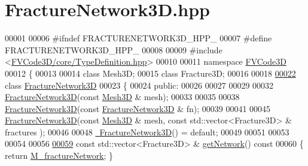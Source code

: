 \hypertarget{FractureNetwork3D_8hpp_source}{}\section{Fracture\+Network3\+D.\+hpp}
\label{FractureNetwork3D_8hpp_source}

\begin{DoxyCode}
00001 
00006 \textcolor{preprocessor}{#ifndef FRACTURENETWORK3D\_HPP\_}
00007 \textcolor{preprocessor}{#define FRACTURENETWORK3D\_HPP\_}
00008 
00009 \textcolor{preprocessor}{#include <\hyperlink{TypeDefinition_8hpp}{FVCode3D/core/TypeDefinition.hpp}>}
00010 
00011 \textcolor{keyword}{namespace }\hyperlink{namespaceFVCode3D}{FVCode3D}
00012 \{
00013 
00014 \textcolor{keyword}{class }Mesh3D;
00015 \textcolor{keyword}{class }Fracture3D;
00016 
00018 
\hypertarget{FractureNetwork3D_8hpp_source.tex_l00022}{}\hyperlink{classFVCode3D_1_1FractureNetwork3D}{00022} \textcolor{keyword}{class }\hyperlink{classFVCode3D_1_1FractureNetwork3D}{FractureNetwork3D}
00023 \{
00024 \textcolor{keyword}{public}:
00026 
00027 
00029 
00032     \hyperlink{classFVCode3D_1_1FractureNetwork3D_a7e6918d382abdc58f2d5e2ef62a70333}{FractureNetwork3D}(\textcolor{keyword}{const} \hyperlink{classFVCode3D_1_1Mesh3D}{Mesh3D} & mesh);
00033 
00035 
00038     \hyperlink{classFVCode3D_1_1FractureNetwork3D_a7e6918d382abdc58f2d5e2ef62a70333}{FractureNetwork3D}(\textcolor{keyword}{const} \hyperlink{classFVCode3D_1_1FractureNetwork3D}{FractureNetwork3D} & fn);
00039 
00041 
00045     \hyperlink{classFVCode3D_1_1FractureNetwork3D_a7e6918d382abdc58f2d5e2ef62a70333}{FractureNetwork3D}(\textcolor{keyword}{const} \hyperlink{classFVCode3D_1_1Mesh3D}{Mesh3D} & mesh, \textcolor{keyword}{const} std::vector<Fracture3D> & fractures
      );
00046 
00048     \hyperlink{classFVCode3D_1_1FractureNetwork3D_a535802ea9935cb4daac9ec92a83bcfe7}{~FractureNetwork3D}() = \textcolor{keywordflow}{default};
00049 
00051 
00053 
00054 
00056 
\hypertarget{FractureNetwork3D_8hpp_source.tex_l00059}{}\hyperlink{classFVCode3D_1_1FractureNetwork3D_ad9a40fd0d922b50d29d60e8c4d65f496}{00059}     \textcolor{keyword}{const} std::vector<Fracture3D> & \hyperlink{classFVCode3D_1_1FractureNetwork3D_ad9a40fd0d922b50d29d60e8c4d65f496}{getNetwork}()\textcolor{keyword}{ const}
00060 \textcolor{keyword}{        }\{ \textcolor{keywordflow}{return} \hyperlink{classFVCode3D_1_1FractureNetwork3D_a1e0856e5834de015bd19c479724b89ba}{M\_fractureNetwork}; \}

\end{DoxyCode}

